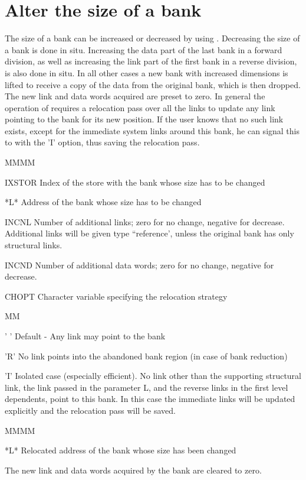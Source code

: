 \section{Alter the size of a bank}
\par The size of a bank can be increased or decreased by using .
Decreasing the size of a bank is done in situ. Increasing the data
part of the last bank in a forward division, as well as increasing
the link part of the first bank in a reverse division, is also done
in situ.
In all other cases a new bank with increased dimensions is lifted
to receive a copy of the data from the original bank, which is then
dropped. The new link and data words acquired are preset to zero.
In general the operation of  requires a relocation pass over all
the links to update any link pointing to the bank for its new position.
If the user knows that no such link exists, except for the immediate
system links around this bank, he can signal this to  with the
'I' option, thus saving the relocation pass.
\Idesc
\begin{DL}{MMMM}
\item[IXSTOR]Index of the store with the bank whose size has to be changed
\item[*L*]Address of the bank whose size has to be changed
\item[INCNL]Number of additional links;
zero for no change, negative for decrease.
Additional links will be given type ``reference',
unless the original bank has only structural links.
\item[INCND]Number of additional data words;
zero for no change, negative for decrease.
\item[CHOPT]Character variable specifying the relocation strategy
\begin{DL}{MM}
\item[' ']Default - Any link may point to the bank
\item['R']No link points into the abandoned bank region
(in case of bank reduction)
\item['I']Isolated case (especially efficient).
No link other than the supporting
structural link, the link passed in the parameter L,
and the reverse links in the first level dependents,
point to this bank.
In this case the immediate links will be updated explicitly
and the relocation pass will be saved.
\end{DL}
\end{DL}
\Odesc
\begin{DL}{MMMM}
\item[*L*]Relocated address of the bank whose size has been changed
\end{DL}
\par The new link and data words acquired by the bank
are cleared to zero.
